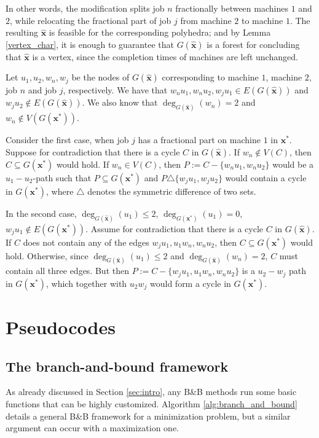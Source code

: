 \documentclass[moor,sglanonrev]{informs4}
\theoremstyle{plain}
\begin{document}
\begin{APPENDICES}
    In other words, the modification splits job $n$ fractionally between machines $1$ and $2$, while relocating the fractional part of job $j$ from machine $2$ to machine $1$. The resulting $\bm{\hat{x}}$ is feasible for the corresponding polyhedra; and by Lemma \ref{vertex_char}, it is enough to guarantee that $G(\bm{\hat{x}})$ is a forest for concluding that $\bm{\hat{x}}$ is a vertex, since the completion times of machines are left unchanged.

    Let $u_1, u_2, w_n, w_j$ be the nodes of $G(\bm{\hat{x}})$ corresponding to machine $1$, machine $2$, job $n$ and job $j$, respectively. We have that $w_n u_1, w_n u_2, w_j u_1 \in E(G(\bm{\hat{x}}))$ and $w_j u_2 \not \in E(G(\bm{\hat{x}}))$. We also know that $\deg _{G(\bm{\hat{x}})} (w_n) = 2$ and $w_n \not \in V(G(\bm{x}^*))$.

    Consider the first case, when job $j$ has a fractional part on machine $1$ in $\bm{x}^*$. Suppose for contradiction that there is a cycle $C$ in $G(\bm{\hat{x}})$. If $w_n \not \in V(C)$, then $C \subseteq G(\bm{x}^*)$ would hold. If $w_n \in V(C)$, then $P:=C-\{w_n u_1,w_nu_2\}$ would be a $u_1 -u_2$-path such that $P\subseteq G(\bm{x}^*)$ and $P \triangle \{w_j u_1, w_j u_2\}$ would contain a cycle in $G(\bm{x}^*)$, where $\triangle$ denotes the symmetric difference of two sets.

    In the second case, $\deg_{G(\bm{\hat{x}})} (u_1) \le 2$, $\deg_{G(\bm{x}^*)}(u_1) = 0$, $w_j u_1 \not \in E(G(\bm{x}^*))$. Assume for contradiction that there is a cycle $C$ in $G(\bm{\hat{x}})$. If $C$ does not contain any of the edges $w_j u_1, u_1 w_n, w_n u_2$, then $C \subseteq G(\bm{x}^*)$ would hold. Otherwise, since $\deg_{G(\bm{\hat{x}})} (u_1) \le 2$ and $\deg_{G(\bm{\hat{x}})} (w_n)= 2$, $C$ must contain all three edges. But then $P:= C - \{w_j u_1, u_1 w_n, w_n u_2\}$ is a $u_2 - w_j$ path in $G(\bm{x}^*)$, which together with $u_2 w_j$ would form a cycle in $G(\bm{x}^*)$. \hfill \Halmos


\section{Pseudocodes}\label{app:pseudocode}

\subsection{The branch-and-bound framework}
As already discussed in Section \ref{sec:intro}, any B\&B methods run some basic functions that can be highly customized. 
%
Algorithm \ref{alg:branch_and_bound} details a general B\&B framework for a minimization problem, but a similar argument can occur with a maximization one. 


\end{APPENDICES}
\end{document}
